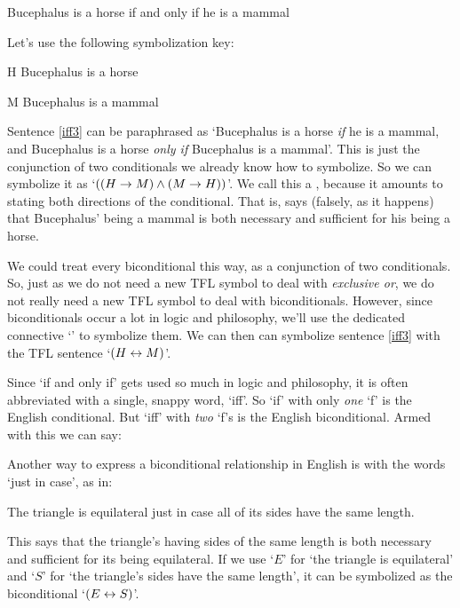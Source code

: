 	\begin{earg}
		\item[\ex{iff3}] Bucephalus is a horse if and only if he is a mammal
	\end{earg}
Let's use the following symbolization key:
	\begin{ekey}
		\item[H]  Bucephalus is a horse
		\item[M]  Bucephalus is a mammal
	\end{ekey}
Sentence \ref{iff3} can be paraphrased as `Bucephalus is a horse \emph{if} he is a mammal, and  Bucephalus is a horse \emph{only if}  Bucephalus is a mammal'. This is just the conjunction of two conditionals we already know how to symbolize.   So we can symbolize it as `$((H \rightarrow M) \wedge (M \rightarrow H))$'. We call this a , because it amounts to stating both directions of the conditional.  That is,  says (falsely, as it happens) that  Bucephalus' being a mammal is both necessary and sufficient for his being a horse.

We could treat every biconditional this way, as a conjunction of two conditionals. So, just as we do not need a new TFL symbol to deal with \emph{exclusive or}, we do not really need a new TFL symbol to deal with biconditionals. However, since biconditionals occur a lot in logic and philosophy, we'll use the dedicated connective `\eiff' to symbolize them. We can then can symbolize sentence \ref{iff3} with the TFL sentence `$(H \leftrightarrow M)$'.

Since `if and only if' gets used so much in logic and philosophy, it is often abbreviated with a single, snappy word, `iff'. So `if' with only \emph{one} `f' is the English conditional. But `iff' with \emph{two} `f's is the English biconditional. Armed with this we can say:

Another way to express a biconditional relationship in English is with the words `just in case', as in:
\begin{earg}
\item[\ex{iff2}] The triangle is equilateral just in case all of its sides have the same length.
\end{earg}
This says that the triangle's having sides of the same length is both necessary and sufficient for its being equilateral. If we use `$E$' for `the triangle is equilateral' and `$S$' for `the triangle's sides have the same length', it can be symbolized as the biconditional `$(E \leftrightarrow S)$'.


